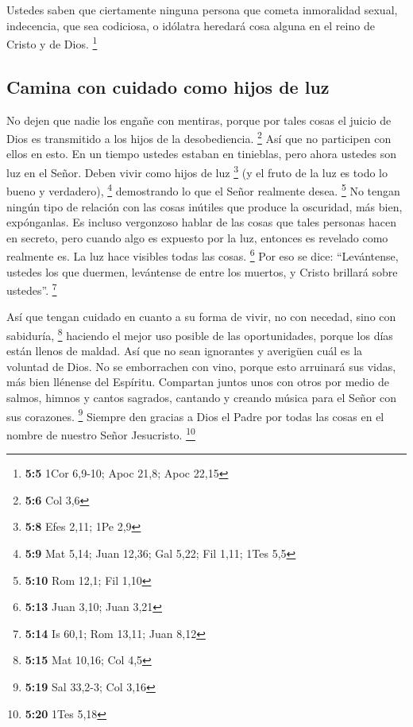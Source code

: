  Ustedes saben que ciertamente ninguna persona que cometa
inmoralidad sexual, indecencia, que sea codiciosa, o idólatra heredará
cosa alguna en el reino de Cristo y de Dios. \footnote{\textbf{5:5} 1Cor
  6,9-10; Apoc 21,8; Apoc 22,15}

\hypertarget{camina-con-cuidado-como-hijos-de-luz}{%
\subsection{Camina con cuidado como hijos de
luz}\label{camina-con-cuidado-como-hijos-de-luz}}

 No dejen que nadie los engañe con mentiras, porque por
tales cosas el juicio de Dios es transmitido a los hijos de la
desobediencia. \footnote{\textbf{5:6} Col 3,6}  Así que no
participen con ellos en esto.  En un tiempo ustedes
estaban en tinieblas, pero ahora ustedes son luz en el Señor. Deben
vivir como hijos de luz \footnote{\textbf{5:8} Efes 2,11; 1Pe 2,9}
 (y el fruto de la luz es todo lo bueno y verdadero),
\footnote{\textbf{5:9} Mat 5,14; Juan 12,36; Gal 5,22; Fil 1,11; 1Tes
  5,5}  demostrando lo que el Señor realmente desea.
\footnote{\textbf{5:10} Rom 12,1; Fil 1,10}  No tengan
ningún tipo de relación con las cosas inútiles que produce la oscuridad,
más bien, expónganlas.  Es incluso vergonzoso hablar de
las cosas que tales personas hacen en secreto,  pero
cuando algo es expuesto por la luz, entonces es revelado como realmente
es. La luz hace visibles todas las cosas. \footnote{\textbf{5:13} Juan
  3,10; Juan 3,21}  Por eso se dice: ``Levántense,
ustedes los que duermen, levántense de entre los muertos, y Cristo
brillará sobre ustedes''. \footnote{\textbf{5:14} Is 60,1; Rom 13,11;
  Juan 8,12}

 Así que tengan cuidado en cuanto a su forma de vivir, no
con necedad, sino con sabiduría, \footnote{\textbf{5:15} Mat 10,16; Col
  4,5}  haciendo el mejor uso posible de las
oportunidades, porque los días están llenos de maldad. 
Así que no sean ignorantes y averigüen cuál es la voluntad de Dios.
 No se emborrachen con vino, porque esto arruinará sus
vidas, más bien llénense del Espíritu.  Compartan juntos
unos con otros por medio de salmos, himnos y cantos sagrados, cantando y
creando música para el Señor con sus corazones. \footnote{\textbf{5:19}
  Sal 33,2-3; Col 3,16}  Siempre den gracias a Dios el
Padre por todas las cosas en el nombre de nuestro Señor Jesucristo.
\footnote{\textbf{5:20} 1Tes 5,18}

